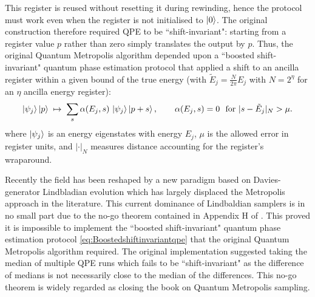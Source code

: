  This register is reused without resetting it during rewinding, hence the protocol must work even when the register is not initialised to $\ket{0}$. The original construction therefore required QPE to be ``shift-invariant": starting from a register value $p$ rather than zero simply translates the output by $p$.  Thus, the original Quantum Metropolis algorithm depended upon a  ``boosted shift-invariant" quantum phase estimation protocol that applied a shift to an ancilla register within a given bound of the true energy (with $\tilde E_j = \frac{N}{2\pi}E_j$ with $N=2^{\eta}$ for an $\eta$ ancilla energy register):
\begin{equation}
  \ket{\psi_j}\ket{p} \;\mapsto\; \sum_{s} \alpha(E_j,s)\,\ket{\psi_j}\ket{p+s},
  \qquad\alpha(E_j,s) = 0 \ \text{ for } |s-\tilde E_j|_{N} > \mu .
  \label{eq:Boostedshiftinvariantqpe}
\end{equation}
where $\ket{\psi_j}$ is an energy eigenstates with energy $E_j$, $\mu$ is the allowed error in register units, and $|\cdot|_{N}$ measures distance accounting for the register’s wraparound.

Recently the field has been reshaped by a new paradigm based on Davies-generator Lindbladian evolution \cite{chen2023quantumthermalstatepreparation,Kastoryano2014QuantumGS,shtanko2021preparing,chen2021fast,chen2023efficient,rall2023thermal,gilyen2024quantum,ding2025efficient,ding2025end,guo2025designing,chen2025efficient, hahn2026efficient, scandi2026thermalization,leng2026accelerating,rouze2026optimal,lloyd2026quantum,Rouz__2026} which has largely displaced the Metropolis approach in the literature. This current dominance of Lindbaldian samplers is in no small part due to the no-go theorem contained in Appendix H of \cite{chen2023quantumthermalstatepreparation}. This proved it is impossible to implement the ``boosted shift-invariant" quantum phase estimation protocol \eqref{eq:Boostedshiftinvariantqpe} that the original Quantum Metropolis algorithm required.  The original implementation \cite{Temme_2011} suggested taking the median of multiple QPE runs which fails to be ``shift-invariant" as the difference of medians is not necessarily close to the median of the differences. This no-go theorem is widely regarded as closing the book on Quantum Metropolis sampling. 

